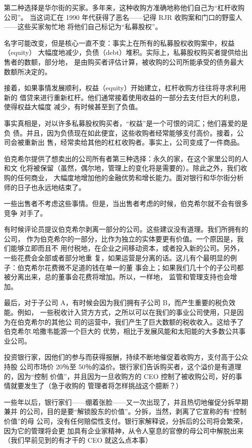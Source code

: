 \documentclass[UTF8,a4paper,zihao=-4,fontset = windows]{ctexart} %
\begin{document}
第二种选择是华尔街的买家。多年来，这种收购方准确地称他们自己为“杠杆收购公司”。
当这词汇在 1990 年代获得了恶名——记得 RJR 收购案和门口的野蛮人——这些买家匆忙地
将他们自己标记为“私募股权”。

名字可能改变，但是核心一直不变：事实上在所有的私募股权收购案中，权益（equity）
大幅度地减少，负债（debt）堆积。实际上，私募股权购买者提供给出售者的数额，部分地，
是由购买者评估计算，被收购的公司所能承受的债务最大数额所决定的。

接着，如果事情发展顺利，权益（equity）开始建立，杠杆收购方往往将寻求利用新的
借贷来进行重新杠杆。他们通常接着使用收益的一部分去支付巨大的利息，使得权益大幅度
减少，有时候甚至到了负值。

事实真相是，对以许多私募股权购买者，“权益”是一个可恨的词汇；他们喜爱的是负
债。并且，因为负债现在如此便宜，这些收购者经常能够支付高价。接着，公司会被重新出
售，经常卖给其他的杠杠收购者。事实上，公司变成了一件商品。

伯克希尔提供了想卖出的公司所有者第三种选择：永久的家，在这个家里公司的人和文
化将被保留（虽然，偶尔地，管理上的变化将是需要的）。除此之外，我们收购的任何商业，
大幅度地增加他的金融优势和增长能力。面对银行和华尔街分析师的日子也永远地结束了。

一些出售者不考虑这些事情。但是，当出售者考虑的时候，伯克希尔就不会有很多竞争
对手了。

有时候评论员提议伯克希尔剥离一部分的公司。这些建议没有道理。我们所拥有的公司，
作为伯克希尔的一部分，比作为独立的实体要更有价值。一个原因是，我们能够立即而且不
用付税地，在企业之间移动资本，或者投入新的公司。另外，一些花费会全部或者部分地重
复，如果运营是分离的话。这儿有个最明显的例子：伯克希尔花费微不足道的钱在单一的董
事会上；如果我们几十个的子公司都被分离出来，总的董事会花费将增加。所以，一样地，
监管和管理支持也会增加。

最后，对于子公司 A，有时候会因为我们拥有子公司 B，而产生重要的税负效能。例如，
一些税收计入贷方方式，之所以可以在我们的事业公司使用，只是因为在伯克希尔的其他公
司的运营中，我们产生了巨大数额的税收收入。这给予了伯克希尔.哈撒韦能源一个巨大的
优势，相比于发展风能和太阳能的大多数公共事业公司。

投资银行家，因他们的参与而获得报酬，持续不断地催促着收购方，支付高于公众持股
公司市场价 20％至 50％的溢价。银行家们告诉购买者，这个溢价是有道理的，因为“控制
价值”，并且因为一旦收购方的 CEO 控制了被收购公司，好的事情就要发生了（急于收购的
管理者将怎样挑战这个臆断？）

一些年以后，银行家们——绷着张脸——又一次出现了，并且热切地催促分拆早期兼并
的公司，目的是要“解锁股东的价值”。分拆，当然，剥离了它宣称的有“控制价值”的母
公司，没有任何赔偿性支付。银行家解释说，分拆后的公司将会繁荣，因为它的管理将会更
加具有企业家精神，从令人窒息的官僚的母公司中解脱出来（我们早前见到的有才干的 CEO
就这么点本事）
\end{document}
